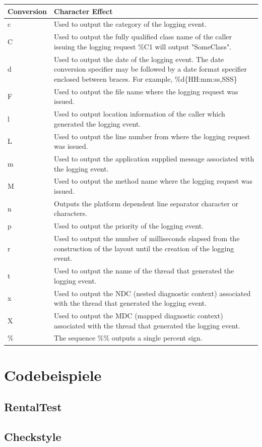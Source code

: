 \documentclass[10pt]{article}
\begin{document}
	\begin{table}[h]
		\begin{tabular}{|p{1.5cm}|p{15cm}|}
		\hline
		Conversion & Character	Effect \\
		\hline
c &	Used to output the category of the logging event. \\ \hline
C &	Used to output the fully qualified class name of the caller issuing the logging request \%C{1} will output "SomeClass". \\ \hline
d &	Used to output the date of the logging event. The date conversion specifier may be followed by a date format specifier enclosed between braces. For example, \%d\{HH:mm:ss,SSS\} \\ \hline
F &	Used to output the file name where the logging request was issued.\\ \hline
l &	Used to output location information of the caller which generated the logging event. \\ \hline
L &	Used to output the line number from where the logging request was issued.\\ \hline
m & Used to output the application supplied message associated with the logging event.\\ \hline
M &	Used to output the method name where the logging request was issued. \\ \hline
n &	Outputs the platform dependent line separator character or characters. \\ \hline
p &	Used to output the priority of the logging event.\\ \hline
r &	Used to output the number of milliseconds elapsed from the construction of the layout until the creation of the logging event.\\ \hline
t &	Used to output the name of the thread that generated the logging event.\\ \hline
x &	Used to output the NDC (nested diagnostic context) associated with the thread that generated the logging event.\\ \hline
X &	Used to output the MDC (mapped diagnostic context) associated with the thread that generated the logging event. \\ \hline
\% & The sequence \%\% outputs a single percent sign.\\
			\hline
		\end{tabular}
	\end{table}

	
	
	\newpage
    \section{Codebeispiele} \label{sec:codebeispiele}
    \subsection{RentalTest} \label{subsec:rentaltest}
    
	\newpage
    \subsection{Checkstyle} \label{subsec:heckstyle}
    
    
\end{document}
